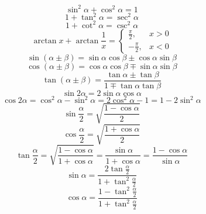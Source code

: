 \documentclass[]{article}
\numberwithin{equation}{section}
\begin{document}
\section{}
\begin{equation}
    \sin^2\alpha+\cos^2\alpha=1
\end{equation}
\begin{equation}
    1+\tan^2\alpha=\sec^2\alpha
\end{equation}
\begin{equation}
    1+\cot^2\alpha=\csc^2\alpha
\end{equation}
\begin{equation}
    \arctan x+\arctan\frac{1}{x}=\begin{cases}
        \frac{\pi}{2},  & x>0 \\
        -\frac{\pi}{2}, & x<0
    \end{cases}
\end{equation}
\begin{equation}
    \sin(\alpha\pm\beta)=\sin\alpha\cos\beta\pm\cos\alpha\sin\beta
\end{equation}
\begin{equation}
    \cos(\alpha\pm\beta)=\cos\alpha\cos\beta\mp\sin\alpha\sin\beta
\end{equation}
\begin{equation}
    \tan(\alpha\pm\beta)=\frac{\tan\alpha\pm\tan\beta}{1\mp\tan\alpha\tan\beta}
\end{equation}
\begin{equation}
    \sin2\alpha=2\sin\alpha\cos\alpha
\end{equation}
\begin{equation}
    \cos2\alpha=\cos^2\alpha-\sin^2\alpha=2\cos^2\alpha-1=1-2\sin^2\alpha
\end{equation}
\begin{equation}
    \sin\frac{\alpha}{2}=\sqrt{\frac{1-\cos\alpha}{2}}
\end{equation}
\begin{equation}
    \cos\frac{\alpha}{2}=\sqrt{\frac{1+\cos\alpha}{2}}
\end{equation}
\begin{equation}
    \tan\frac{\alpha}{2}=\sqrt{\frac{1-\cos\alpha}{1+\cos\alpha}}=\frac{\sin\alpha}{1+\cos\alpha}=\frac{1-\cos\alpha}{\sin\alpha}
\end{equation}
\begin{equation}
    \sin\alpha=\frac{2\tan\frac{\alpha}{2}}{1+\tan^2\frac{\alpha}{2}}
\end{equation}
\begin{equation}
    \cos\alpha=\frac{1-\tan^2\frac{\alpha}{2}}{1+\tan^2\frac{\alpha}{2}}
\end{equation}
\end{document}

